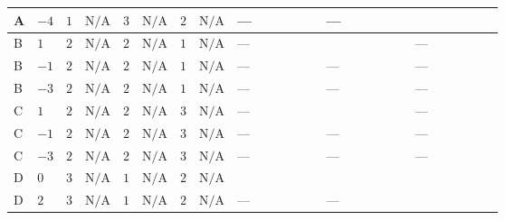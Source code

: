 \documentclass[8pt]{article}
\begin{document}
\begin{landscape}
\begin{longtable}{@{}llcccccc >{\raggedright\arraybackslash}p{0.21\linewidth} >{\raggedright\arraybackslash}p{0.21\linewidth} >{\raggedright\arraybackslash}p{0.21\linewidth}@{}}
\midrule
A & $-4$ & $1$ & $\text{N/A}$ & $3$ & $\text{N/A}$ & $2$ & $\text{N/A}$ & --- & --- & \scriptsize\adjustbox{max width=\linewidth}{$\begin{gathered} -\frac{9 {g_2}^2 {\lambda_{HS_1}^{(1)}}}{2}\end{gathered}$} \\
\midrule
B & $1$ & $2$ & $\text{N/A}$ & $2$ & $\text{N/A}$ & $1$ & $\text{N/A}$ & --- & \scriptsize\adjustbox{max width=\linewidth}{$\begin{gathered} +24 {\lambda_{X_{15}}} \left({\lambda_{X_{15}}}\right)^{*}\end{gathered}$} & --- \\
\midrule
B & $-1$ & $2$ & $\text{N/A}$ & $2$ & $\text{N/A}$ & $1$ & $\text{N/A}$ & --- & --- & --- \\
\midrule
B & $-3$ & $2$ & $\text{N/A}$ & $2$ & $\text{N/A}$ & $1$ & $\text{N/A}$ & --- & --- & --- \\
\midrule
C & $1$ & $2$ & $\text{N/A}$ & $2$ & $\text{N/A}$ & $3$ & $\text{N/A}$ & --- & \scriptsize\adjustbox{max width=\linewidth}{$\begin{gathered} +24 {\lambda_{X_{15}}} \left({\lambda_{X_{15}}}\right)^{*}\end{gathered}$} & --- \\
\midrule
C & $-1$ & $2$ & $\text{N/A}$ & $2$ & $\text{N/A}$ & $3$ & $\text{N/A}$ & --- & --- & --- \\
\midrule
C & $-3$ & $2$ & $\text{N/A}$ & $2$ & $\text{N/A}$ & $3$ & $\text{N/A}$ & --- & --- & --- \\
\midrule
D & $0$ & $3$ & $\text{N/A}$ & $1$ & $\text{N/A}$ & $2$ & $\text{N/A}$ & \scriptsize\adjustbox{max width=\linewidth}{$\begin{gathered} +4 {\lambda_{X_{18}}} (5 \left({\lambda_{X_{9}}}\right)^{*}+4 \left({\lambda_{X_{18}}}\right)^{*})\end{gathered}$} & \scriptsize\adjustbox{max width=\linewidth}{$\begin{gathered} +4 {\lambda_{X_{14}}} \left({\lambda_{X_{14}}}\right)^{*}\end{gathered}$} & \scriptsize\adjustbox{max width=\linewidth}{$\begin{gathered} -\frac{33 {g_2}^2 {\lambda_{HS_1}^{(1)}}}{2}\end{gathered}$} \\
\midrule
D & $2$ & $3$ & $\text{N/A}$ & $1$ & $\text{N/A}$ & $2$ & $\text{N/A}$ & --- & --- & \scriptsize\adjustbox{max width=\linewidth}{$\begin{gathered} -\frac{33 {g_2}^2 {\lambda_{HS_1}^{(1)}}}{2}\end{gathered}$} \\

\end{longtable}
\end{landscape}
\end{document}
